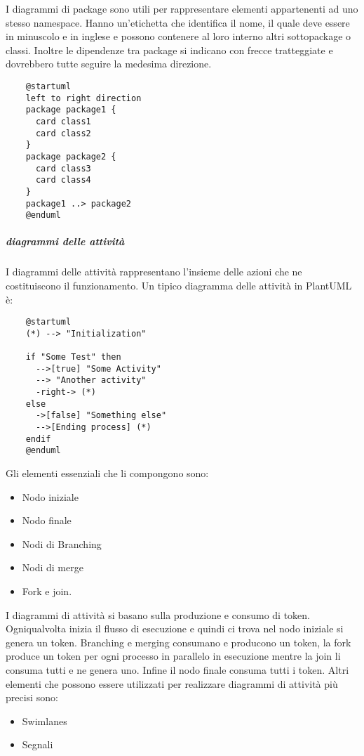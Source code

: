 \documentclass[../../norme-di-progetto.tex]{subfiles}
\begin{document}
I diagrammi di package sono utili per rappresentare elementi appartenenti ad uno stesso namespace. Hanno un'etichetta che identifica il nome, il quale deve essere in minuscolo e in inglese e possono contenere al loro interno altri sottopackage o classi. Inoltre le dipendenze tra package si indicano con frecce tratteggiate e dovrebbero tutte seguire la medesima direzione.
\begin{center}
  \begin{verbatim}
    @startuml
    left to right direction
    package package1 {
      card class1
      card class2
    }
    package package2 {
      card class3
      card class4
    }
    package1 ..> package2
    @enduml
 \end{verbatim}
 \end{center}
 \subparagraph{diagrammi delle attività}%
 \label{diagrammi_delle_attivita}%
 I diagrammi delle attività rappresentano l'insieme delle azioni che ne costituiscono il funzionamento. Un tipico diagramma delle attività in PlantUML è:
 \begin{center}
  \begin{verbatim}
    @startuml
    (*) --> "Initialization"

    if "Some Test" then
      -->[true] "Some Activity"
      --> "Another activity"
      -right-> (*)
    else
      ->[false] "Something else"
      -->[Ending process] (*)
    endif
    @enduml
    \end{verbatim}
  \end{center}
  Gli elementi essenziali che li compongono sono:
  \begin{itemize}
    \item Nodo iniziale
    \item Nodo finale
    \item Nodi di Branching
    \item Nodi di merge
    \item Fork e join.
  \end{itemize}
  I diagrammi di attività si basano sulla produzione e consumo di token. Ogniqualvolta inizia il flusso di esecuzione e quindi ci trova nel nodo iniziale si genera un token. Branching e merging consumano e producono un token, la fork produce un token per ogni processo in parallelo in esecuzione mentre la join li consuma tutti e ne genera uno. Infine il nodo finale consuma tutti i token.
  Altri elementi che possono essere utilizzati per realizzare diagrammi di attività più precisi sono:
  \begin{itemize}
    \item Swimlanes
    \item Segnali
  \end{itemize}
\end{document}
